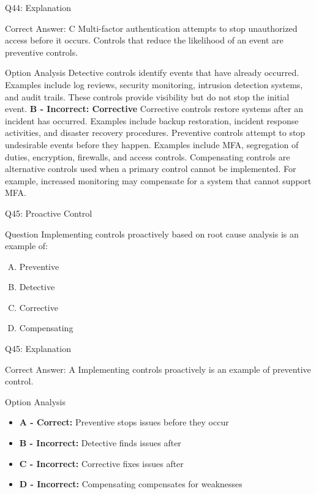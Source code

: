 \documentclass{beamer}
\begin{document}
	\begin{frame}[shrink=10]{Q44: Explanation} \begin{block}{Correct Answer: C} Multi-factor authentication attempts to stop unauthorized access before it occurs. Controls that reduce the likelihood of an event are preventive controls. \end{block} \begin{block}{Option Analysis}  Detective controls identify events that have already occurred. Examples include log reviews, security monitoring, intrusion detection systems, and audit trails. These controls provide visibility but do not stop the initial event. \textbf{B - Incorrect: Corrective} Corrective controls restore systems after an incident has occurred. Examples include backup restoration, incident response activities, and disaster recovery procedures.   Preventive controls attempt to stop undesirable events before they happen. Examples include MFA, segregation of duties, encryption, firewalls, and access controls. \vspace{0.15cm}  Compensating controls are alternative controls used when a primary control cannot be implemented. For example, increased monitoring may compensate for a system that cannot support MFA. \end{block}  \end{frame}
	
	\begin{frame}{Q45: Proactive Control}
		\begin{block}{Question}
			Implementing controls proactively based on root cause analysis is an example of:
		\end{block}
		\begin{enumerate}[(A)]
			\item Preventive
			\item Detective
			\item Corrective
			\item Compensating
		\end{enumerate}
	\end{frame}
	
	\begin{frame}{Q45: Explanation}
		\begin{block}{Correct Answer: A}
			Implementing controls proactively is an example of preventive control.
		\end{block}
		\begin{block}{Option Analysis}
			\begin{itemize}
				\item \textbf{A - Correct:} Preventive stops issues before they occur
				\item \textbf{B - Incorrect:} Detective finds issues after
				\item \textbf{C - Incorrect:} Corrective fixes issues after
				\item \textbf{D - Incorrect:} Compensating compensates for weaknesses
			\end{itemize}
		\end{block}
	\end{frame}
	
\end{document}
